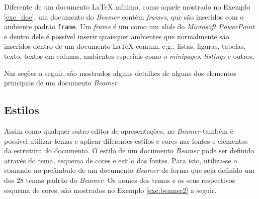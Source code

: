 Diferente de um documento \LaTeX{} mínimo, como aquele mostrado no Exemplo \ref{exe_doc}, um documento do \textit{Beamer} contém \textit{frames}, que são inseridos com o ambiente padrão {\tt frame}. Um \textit{frame} é um como um \textit{slide} do \textit{Microsoft PowerPoint} e dentro dele é possível inserir quaisquer ambientes que normalmente são inseridos dentro de um documento \LaTeX{} comum, e.g., listas, figuras, tabelas, texto, textos em colunas, ambientes especiais como o \textit{minipages}, \textit{listings} e outros.

Nas seções a seguir, são mostrados alguns detalhes de alguns dos elementos principais de um documento \textit{Beamer}.

\subsection{Estilos}
\label{sec:estilos}

Assim como qualquer outro editor de apresentações, no \textit{Beamer} também é possível utilizar temas e aplicar diferentes estilos e cores nas fontes e elementos da estrutura do documento. O estilo de um documento \textit{Beamer} pode ser definido através do tema, esquema de cores e estilo das fontes. Para isto, utiliza-se o comando \texttt{} no preâmbulo de um documento \textit{Beamer} de forma que seja definido um dos 28 temas padrão do \textit{Beamer}. Os nomes dos temas e os seus respectivos esquema de cores, são mostrados no Exemplo \ref{exe:beamer2} a seguir.

